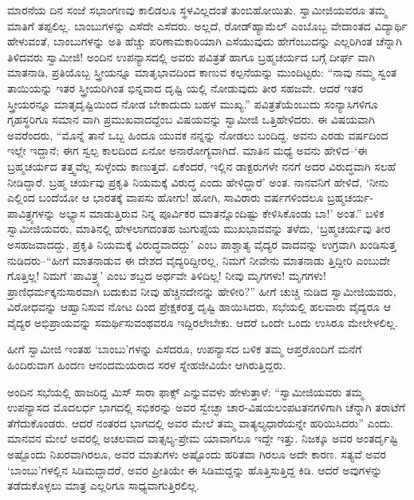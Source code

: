 ಮಾರನೆಯ ದಿನ ಸಂಜೆ ಸಭಾಂಗಣವು ಕಾಲಿಡಲೂ ಸ್ಥಳವಿಲ್ಲದಂತೆ ತುಂಬಿಹೋಯಿತು. ಸ್ವಾಮೀಜಿಯವರೂ ತಮ್ಮ ಮಾತಿಗೆ ತಪ್ಪಲಿಲ್ಲ. ಬಾಂಬುಗಳನ್ನು ಎಸೆದೇ ಎಸೆದರು. ಅಲ್ಲದೆ, ರೋಡ್​ಹ್ಯಾಮೆಲ್ ಎಂಬೊಬ್ಬ ವೇದಾಂತದ ವಿದ್ಯಾರ್ಥಿ ಹೇಳುವಂತೆ, ಬಾಂಬುಗಳನ್ನು ಅತಿ ಹೆಚ್ಚು ಪರಿಣಾಮಕಾರಿಯಾಗಿ ಎಸೆಯುವುದು ಹೇಗೆಂಬುದನ್ನು ಎಲ್ಲರಿಗಿಂತ ಚೆನ್ನಾಗಿ ತಿಳಿದವರು ಸ್ವಾಮೀಜಿ! ಅಂದಿನ ಉಪನ್ಯಾಸದಲ್ಲಿ ಅವರು ಪವಿತ್ರತೆ ಹಾಗೂ ಬ್ರಹ್ಮಚರ್ಯದ ಬಗ್ಗೆ ದೀರ್ಘ ವಾಗಿ ಮಾತನಾಡಿ, ಪ್ರತಿಯೊಬ್ಬ ಸ್ತ್ರೀಯನ್ನೂ ಮಾತೃಭಾವದಿಂದ ಕಾಣುವ ಕಲ್ಪನೆಯನ್ನು ಮುಂದಿಟ್ಟರು: “ನಾವು ನಮ್ಮ ಸ್ವಂತ ತಾಯಿಯನ್ನು ಇತರ ಸ್ತ್ರೀಯರಿಗಿಂತ ಭಿನ್ನವಾದ ದೃಷ್ಟಿ ಯಲ್ಲಿ ನೋಡುವುದು ತೀರ ಸಹಜವೇ. ಆದರೆ ಇತರ ಸ್ತ್ರೀಯರನ್ನೂ ಮಾತೃದೃಷ್ಟಿಯಿಂದ ನೋಡ ಬೇಕಾದುದು ಬಹಳ ಮುಖ್ಯ.” ಪವಿತ್ರತೆಯೆಂಬುದು ಸಂನ್ಯಾಸಿಗಳಿಗೂ ಗೃಹಸ್ಥರಿಗೂ ಸಮಾನ ವಾಗಿ ಪ್ರಮುಖವಾದದ್ದೆಂಬ ವಿಷಯವನ್ನು ಸ್ವಾಮೀಜಿ ಒತ್ತಿಹೇಳಿದರು. ಈ ವಿಷಯವಾಗಿ ಅವರೆಂದರು, “ಮೊನ್ನೆ ತಾನೆ ಒಬ್ಬ ಹಿಂದೂ ಯುವಕ ನನ್ನನ್ನು ನೋಡಲು ಬಂದಿದ್ದ. ಅವನು ಎರಡು ವರ್ಷದಿಂದ ಇಲ್ಲೇ ಇದ್ದಾನೆ; ಈಗ ಸ್ವಲ್ಪ ಕಾಲದಿಂದ ಏನೋ ಅನಾರೋಗ್ಯವಾಗಿದೆ. ಮಾತಿನ ಮಧ್ಯೆ ಅವನು ಹೇಳಿದ–‘ಈ ಬ್ರಹ್ಮಚರ್ಯದ ತತ್ತ್ವವೆಲ್ಲ ಸುಳ್ಳೆಂದು ಕಾಣುತ್ತದೆ. ಏಕೆಂದರೆ, ಇಲ್ಲಿನ ಡಾಕ್ಟರುಗಳೇ ನನಗೆ ಅದರ ವಿರುದ್ಧವಾಗಿ ಸಲಹೆ ನೀಡಿದ್ದಾರೆ. ಬ್ರಹ್ಮ ಚರ್ಯವು ಪ್ರಕೃತಿ ನಿಯಮಕ್ಕೆ ವಿರುದ್ಧ ಎಂದು ಹೇಳಿದ್ದಾರೆ’ ಅಂತ. ನಾನವನಿಗೆ ಹೇಳಿದೆ, ‘ನೀನು ಎಲ್ಲಿಂದ ಬಂದೆಯೋ ಆ ಭಾರತಕ್ಕೆ ವಾಪಸು ಹೋಗು! ಹೋಗಿ, ಸಾವಿರಾರು ವರ್ಷಗಳಿಂದಲೂ ಬ್ರಹ್ಮಚರ್ಯ-ಪಾವಿತ್ರ್ಯಗಳನ್ನು ಅಭ್ಯಾಸ ಮಾಡುತ್ತಿರುವ ನಿನ್ನ ಪೂರ್ವಿಕರ ಮಾತನ್ನೊಂದಿಷ್ಟು ಕೇಳಿಸಿಕೊಂಡು ಬಾ!’ ಅಂತ.” ಬಳಿಕ ಸ್ವಾಮೀಜಿಯವರು, ಮಾತಿನಲ್ಲಿ ಹೇಳಲಾಗದಂತಹ ಜುಗುಪ್ಸೆಯ ಮುಖಭಾವವನ್ನು ತಳೆದು, ‘ಬ್ರಹ್ಮಚರ್ಯವು ತೀರ ಅಸಹಜವಾದದ್ದು, ಪ್ರಕೃತಿ ನಿಯಮಕ್ಕೆ ವಿರುದ್ಧವಾದದ್ದು’ ಎಂಬ ಪಾಶ್ಚಾತ್ಯ ವೈದ್ಯರ ವಾದವನ್ನು ಉಗ್ರವಾಗಿ ಖಂಡಿಸುತ್ತ ನುಡಿದರು–“ಹೀಗೆ ಮಾತನಾಡುವ ಈ ದೇಶದ ವೈದ್ಯರಿದ್ದೀರಲ್ಲ, ನಿಮಗೆ ನೀವೇನು ಮಾತನಾಡು ತ್ತಿದ್ದೀರಿ ಎಂಬುದೇ ಗೊತ್ತಿಲ್ಲ! ನಿಮಗೆ ‘ಪಾವಿತ್ರ್ಯ’ ಎಂಬ ಶಬ್ದದ ಅರ್ಥವೇ ತಿಳಿದಿಲ್ಲ! ನೀವು ಮೃಗಗಳು! ಮೃಗಗಳು! ಪ್ರಾಣಿಧರ್ಮಕ್ಕನುಸಾರವಾಗಿ ಬದುಕುವ ನೀವು ಹೆಚ್ಚಿನದೇನನ್ನು ಹೇಳೀರಿ?” ಹೀಗೆ ಚುಚ್ಚಿ ನುಡಿದ ಸ್ವಾಮೀಜಿಯವರು, ವಿರೋಧವನ್ನು ಆಹ್ವಾನಿಸುವ ನೋಟ ದಿಂದ ಪ್ರೇಕ್ಷಕರತ್ತ ದೃಷ್ಟಿ ಹಾಯಿಸಿದರು, ಸಭೆಯಲ್ಲಿ ಹಲವಾರು ವೈದ್ಯರೂ ಆ ವೈದ್ಯರ ಅಭಿಪ್ರಾಯವನ್ನು ಸಮರ್ಥಿಸುವಂಥವರೂ ಇದ್ದಿರಲೇಬೇಕು. ಆದರೆ ಒಂದೇ ಒಂದು ಉಸಿರೂ ಮೇಲೇಳಲಿಲ್ಲ.

ಹೀಗೆ ಸ್ವಾಮೀಜಿ ಇಂತಹ ‘ಬಾಂಬು’ಗಳನ್ನು ಎಸೆದರೂ, ಉಪನ್ಯಾಸದ ಬಳಿಕ ತಮ್ಮ ಆಪ್ತರೊಂದಿಗೆ ಮನೆಗೆ ಹಿಂದಿರುವಾಗ ಹಿಂದಣ ಆನಂದಮಯರಾದ ಸರಳ ಸ್ನೇಹಜೀವಿಯೇ ಆಗಿರುತ್ತಿದ್ದರು.

ಅಂದಿನ ಸಭೆಯಲ್ಲಿ ಹಾಜರಿದ್ದ ಮಿಸ್ ಸಾರಾ ಫಾಕ್ಸ್ ಎನ್ನುವವಳು ಹೇಳುತ್ತಾಳೆ: “ಸ್ವಾಮೀಜಿಯವರು ತಮ್ಮ ಉಪನ್ಯಾಸದ ಮೊದಲರ್ಧ ಭಾಗದಲ್ಲಿ ಸಭಿಕರನ್ನು ಅವರ ಸ್ವೇಚ್ಛಾ ಚಾರ-ವಿಷಯಲಂಪಟತನಗಳಿಗಾಗಿ ಚೆನ್ನಾಗಿ ತರಾಟೆಗೆ ತೆಗೆದುಕೊಂಡರು. ಆದರೆ ನಂತರದ ಭಾಗದಲ್ಲಿ ಅವರ ಮೇಲೆ ತಮ್ಮ ವಾತ್ಯಲ್ಯಧಾರೆಯನ್ನೇ ಹರಿಯಿಸಿದರು” ಎಂದು. ಮಾನವನ ಮೇಲೆ ಅವರಲ್ಲಿ ಅಚಲವಾದ ವಾತ್ಸಲ್ಯ-ಪ್ರೇಮ ಯಾವಾಗಲೂ ಇದ್ದೇ ಇತ್ತು. ನಿಜಕ್ಕೂ ಅವರ ಅಂತರ್ದೃಷ್ಟಿ ಅಷ್ಟೊಂದು ನಿಖರವಾಗಿರಲೂ, ಅವರ ಮಾತುಗಳು ಅಷ್ಟೊಂದು ಹರಿತವಾ ಗಿರಲೂ ಅದೇ ಕಾರಣ. ಸತ್ಯವೆ ಅವರ ‘ಬಾಂಬು’ಗಳಲ್ಲಿನ ಸಿಡಿಮದ್ದಾದರೆ, ಅವರ ಪ್ರೀತಿಯೇ ಈ ಸಿಡಿಮದ್ದನ್ನು ಹೊತ್ತಿಸುತ್ತಿದ್ದ ಕಿಡಿ. ಆದರೆ ಅವುಗಳನ್ನು ತಡೆದುಕೊಳ್ಳಲು ಮಾತ್ರ ಎಲ್ಲರಿಗೂ ಸಾಧ್ಯವಾಗುತ್ತಿರಲಿಲ್ಲ.

